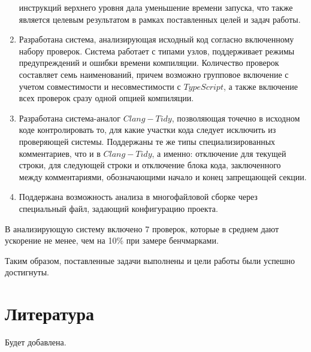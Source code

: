 \documentclass{mipt-thesis-bs}
\begin{document}
\begin{enumerate}
    инструкций верхнего уровня дала уменьшение времени запуска, что также является целевым результатом в рамках 
    поставленных целей и задач работы.
    \item Разработана система, анализирующая исходный код согласно включенному набору проверок. Система работает 
    с типами узлов, поддерживает режимы предупреждений и ошибки времени компиляции. Количество проверок составляет 
    семь наименований, причем возможно групповое включение с учетом совместимости и несовместимости с 
    $TypeScript$, а также включение всех проверок сразу одной опцией компиляции.
    \item Разработана система-аналог $Clang-Tidy$, позволяющая точечно в исходном коде контролировать 
    то, для какие участки кода следует исключить из проверяющей системы. Поддержаны те же типы специализированных 
    комментариев, что и в $Clang-Tidy$, а именно: отключение для текущей строки, для следующей строки и отключение 
    блока кода, заключенного между комментариями, обозначающими начало и конец запрещающей секции.
    \item Поддержана возможность анализа в многофайловой сборке через специальный файл, задающий 
    конфигурацию проекта.
\end{enumerate}

В анализирующую систему включено 7 проверок, которые в среднем дают ускорение не менее, чем на 10\% 
при замере бенчмарками.

Таким образом, поставленные задачи выполнены и цели работы были успешно 
достигнуты.

\backmatter


\chapter{Литература}

Будет добавлена.
\end{document}
